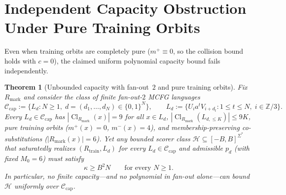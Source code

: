 \documentclass[11pt]{article}
\theoremstyle{plain}
\newtheorem{theorem}{Theorem}
\theoremstyle{definition}
\theoremstyle{remark}
\DeclareMathOperator{\Cl}{Cl}
\begin{document}
\section{Independent Capacity Obstruction Under Pure Training Orbits}

Even when training orbits are completely pure ($m^+ \equiv 0$, so the collision bound holds with $c = 0$), the claimed uniform polynomial capacity bound fails independently.

\begin{theorem}[Unbounded capacity with fan-out~$2$ and pure training orbits]\label{thm:capacity}
Fix $R_{\mathrm{mark}}$ and consider the class of finite fan-out-$2$ MCFG languages
\[
\mathcal{C}_{\mathrm{cap}} := \{L_d : N \ge 1,\; d = (d_1, \dots, d_N) \in \{0, 1\}^N\},
\qquad
L_d := \{U_i a^t V_{i+d_t} : 1 \le t \le N,\; i \in \mathbb{Z}/3\}.
\]
Every $L_d \in \mathcal{C}_{\mathrm{cap}}$ has $|\Cl_{R_{\mathrm{mark}}}(x)| = 9$ for all $x \in L_d$, $|\Cl_{R_{\mathrm{mark}}}(L_{d,\le K})| \le 9K$, pure training orbits ($m^+(x) = 0$, $m^-(x) = 4$), and membership-preserving co-substitutions ($|R_{\mathrm{mark}}(x)| = 6$).
Yet any bounded scorer class $\mathcal{H} \subseteq [-B, B]^{\Sigma^*}$ that saturatedly realizes $(R_{\mathrm{train}}, L_d)$ for every $L_d \in \mathcal{C}_{\mathrm{cap}}$ and admissible $p_d$ (with fixed $M_0 = 6$) must satisfy
\[
\kappa \ge B^2 N \qquad \text{for every } N \ge 1.
\]
In particular, no finite capacity---and no polynomial in fan-out alone---can bound $\mathcal{H}$ uniformly over $\mathcal{C}_{\mathrm{cap}}$.
\end{theorem}
\end{document}
